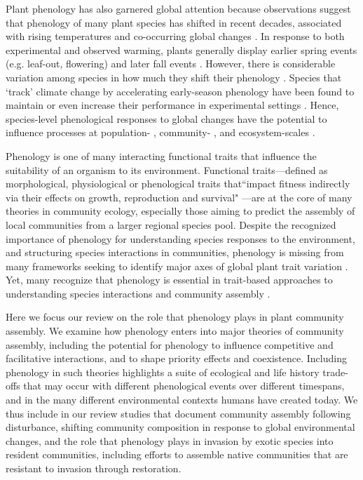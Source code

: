\documentclass[11pt]{article}
\begin{document}
Plant phenology has also garnered global attention because observations suggest that phenology of many plant species has shifted in recent decades, associated with rising temperatures and co-occurring global changes \citep{wolkovich2012warming,parmesan2015plants,menzel2020climate}. In response to both experimental and observed warming, plants generally display earlier spring events (e.g. leaf-out, flowering) and later fall events \citep[e.g. senescence,][]{Henry:1997lg,menzel2020climate}. However, there is considerable variation among species in how much they shift their phenology \citep[][sometimes termed `phenological sensitivity']{cook2012divergent,wolkovich2012warming,konig2018advances}. Species that `track' climate change by accelerating early-season phenology have been found to maintain or even increase their performance in experimental settings \citep{cleland2012phenological,wolkovich2021phenological}. Hence, species-level phenological responses to global changes have the potential to influence processes at population- \citep{iler2021demographic}, community- \citep{cook2012divergent,caradonna2014shifts}, and ecosystem-scales \citep{piao2019plant}.

Phenology is one of many interacting functional traits that influence the suitability of an organism to its environment. Functional traits---defined as morphological, physiological or phenological traits that``impact fitness indirectly via their effects on growth, reproduction and survival" \citep{violle2007let}---are at the core of many theories in community ecology, especially those aiming to predict the assembly of local communities from a larger regional species pool. Despite the recognized importance of phenology for understanding species responses to the environment, and structuring species interactions in communities, phenology is missing from many frameworks seeking to identify major axes of global plant trait variation \citep[e.g.][]{westoby1998leaf,wright2004worldwide,diaz2016global,joswig2022climatic}. Yet, many recognize that phenology is essential in trait-based approaches to understanding species interactions and community assembly \citep{cope2022role}.

Here we focus our review on the role that phenology plays in plant community assembly. We examine how phenology enters into major theories of community assembly, including the potential for phenology to influence competitive and facilitative interactions, and to shape priority effects and coexistence. Including phenology in such theories highlights a suite of ecological and life history trade-offs that may occur with different phenological events over different timespans, and in the many different environmental contexts humans have created today. We thus include in our review studies that document community assembly following disturbance, shifting community composition in response to global environmental changes, and the role that phenology plays in invasion by exotic species into resident communities, including efforts to assemble native communities that are resistant to invasion through restoration. 
\end{document}
